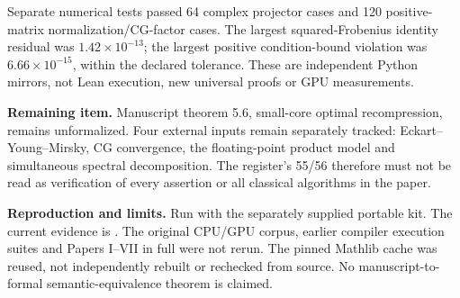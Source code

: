 Separate numerical tests passed 64 complex projector cases and 120 positive-matrix normalization/CG-factor cases. The largest squared-Frobenius identity residual was $1.42\times10^{-13}$; the largest positive condition-bound violation was $6.66\times10^{-15}$, within the declared tolerance. These are independent Python mirrors, not Lean execution, new universal proofs or GPU measurements.

\textbf{Remaining item.} Manuscript theorem 5.6, small-core optimal recompression, remains unformalized. Four external inputs remain separately tracked: Eckart--Young--Mirsky, CG convergence, the floating-point product model and simultaneous spectral decomposition. The register's 55/56 therefore must not be read as verification of every assertion or all classical algorithms in the paper.

\textbf{Reproduction and limits.} Run  with the separately supplied portable kit. The current evidence is . The original CPU/GPU corpus, earlier compiler execution suites and Papers I--VII in full were not rerun. The pinned Mathlib cache was reused, not independently rebuilt or rechecked from source. No manuscript-to-formal semantic-equivalence theorem is claimed.
